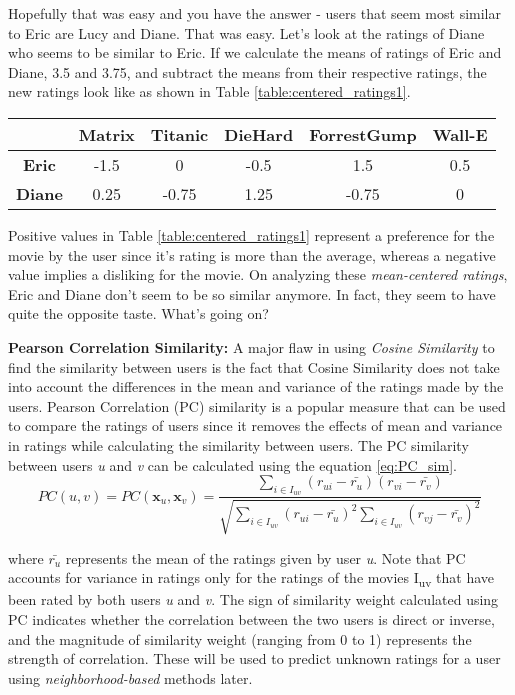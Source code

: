 Hopefully that was easy and you have the answer - users that seem most similar to Eric are Lucy and Diane. That was easy. Let's look at the ratings of Diane who seems to be similar to Eric. If we calculate the means of ratings of Eric and Diane, 3.5 and 3.75, and subtract the means from their respective ratings, the new ratings look like as shown in Table \ref{table:centered_ratings1}.
\begin{table*}
\centering
\begin{tabular}{|c|c|c|c|c|c|}
\hline
\textbf{} 			& \textbf{Matrix} & \textbf{Titanic} & \textbf{DieHard} & \textbf{ForrestGump} & \textbf{Wall-E}\\ 
\hline
\textbf{Eric} 		& 	 	-1.5	  & 		0		 & 		-0.5		&   	1.5			   & 		0.5		\\ 
\hline
\textbf{Diane} 		& 	 	0.25	  & 		-0.75	 & 		1.25		&   	-0.75		   & 		0		\\ 
\hline
\end{tabular}
\caption{Mean Centered Ratings}
\label{table:centered_ratings1}
\end{table*}

Positive values in Table \ref{table:centered_ratings1} represent a preference for the movie by the user since it's rating is more than the average, whereas a negative value implies a disliking for the movie. On analyzing these \textit{mean-centered ratings}, Eric and Diane don't seem to be so similar anymore. In fact, they seem to have quite the opposite taste. What's going on?

\textbf{Pearson Correlation Similarity:} A major flaw in using \textit{Cosine Similarity} to find the similarity between users is the fact that Cosine Similarity does not take into account the differences in the mean and variance of the ratings made by the users. Pearson Correlation (PC) similarity is a popular measure that can be used to compare the ratings of users since it removes the effects of mean and variance in ratings while calculating the similarity between users. The PC similarity between users \textit{u} and \textit{v} can be calculated using the equation \ref{eq:PC_sim}.
 \begin{equation} \label{eq:PC_sim}
PC(u,v) = PC(\textbf{x}_{u}, \textbf{x}_{v}) = \frac
{\sum_{i \in{I_{uv}}}^{}{(r_{ui} - \bar{r_{u}})(r_{vi} - \bar{r_{v}})}}
{\sqrt	{	\sum_{i \in{I_{uv}}}^{}{(r_{ui} - \bar{r_{u}})^2}	\sum_{i \in{I_{uv}}}^{}{(r_{vj} - \bar{r_{v}})^2}}		}
\end{equation}

where $\bar{r_{u}}$ represents the mean of the ratings given by user \textit{u}. Note that PC accounts for variance in ratings only for the ratings of the movies I\textsubscript{uv} that have been rated by both users \textit{u} and \textit{v}. The sign of similarity weight calculated using PC indicates whether the correlation between the two users is direct or inverse, and the magnitude of similarity weight (ranging from 0 to 1) represents the strength of correlation. These will be used to predict unknown ratings for a user using \textit{neighborhood-based} methods later.

